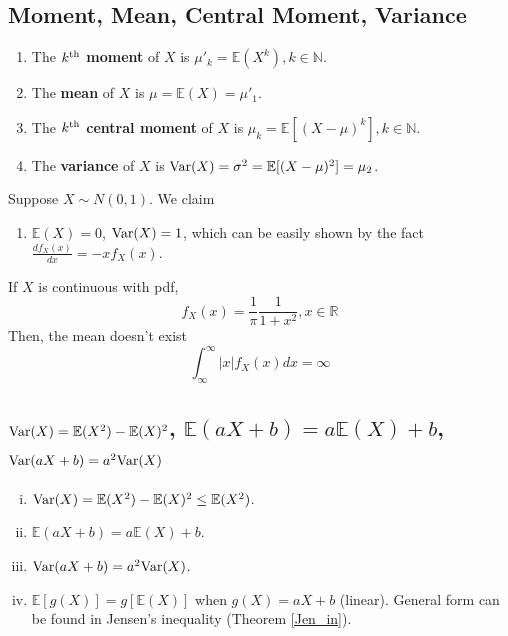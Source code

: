 \documentclass[11pt]{elegantbook}
\begin{document}
\subsection{Moment, Mean, Central Moment, Variance}
\begin{definition}
    \normalfont
    \begin{enumerate}
        \item The \textbf{$k^\textnormal{th}$ moment} of $X$ is $\mu'_k=\mathbb{E}(X^k), k\in \mathbb{N}$.
        \item The \textbf{mean} of $X$ is $\mu=\mathbb{E}(X)=\mu'_1$.
        \item The \textbf{$k^\textnormal{th}$ central moment} of $X$ is $\mu_k=\mathbb{E}[(X-\mu)^k], k\in \mathbb{N}$.
        \item The \textbf{variance} of $X$ is $\textnormal{Var}(X)=\sigma^2=\mathbb{E}[(X-\mu)^2]=\mu_2$.
    \end{enumerate}
\end{definition}
\begin{example}[ $N(0,1)$]
    Suppose $X\sim N(0,1)$. We claim
    \begin{enumerate}[$\circ$]
        \item $\mathbb{E}(X)=0$, $\textnormal{Var}(X)=1$, which can be easily shown by the fact $\frac{d f_X(x)}{d x}=-xf_X(x)$.
    \end{enumerate}
\end{example}

\begin{example}[ Cauchy]
    If $X$ is continuous with pdf, $$f_X(x)=\frac{1}{\pi}\frac{1}{1+x^2}, x\in \mathbb{R}$$
    Then, the mean doesn't exist $$\int_\infty^\infty |x|f_X(x)dx=\infty$$
\end{example}

\subsection{$\textnormal{Var}(X)=\mathbb{E}(X^2)-\mathbb{E}(X)^2$, $\mathbb{E}(aX+b)=a \mathbb{E}(X)+b$, $\textnormal{Var}(aX+b)=a^2 \textnormal{Var}(X)$}
\begin{proposition}
    \begin{enumerate}[(i).]
        \item $\textnormal{Var}(X)=\mathbb{E}(X^2)-\mathbb{E}(X)^2\leq \mathbb{E}(X^2)$.
        \item $\mathbb{E}(aX+b)=a \mathbb{E}(X)+b$.
        \item $\textnormal{Var}(aX+b)=a^2 \textnormal{Var}(X)$.
        \item $\mathbb{E}[g(X)]=g[\mathbb{E}(X)]$ when $g(X)=aX+b$ (linear). General form can be found in Jensen's inequality (Theorem \ref{Jen_in}).
    \end{enumerate}
\end{proposition}
\end{document}

